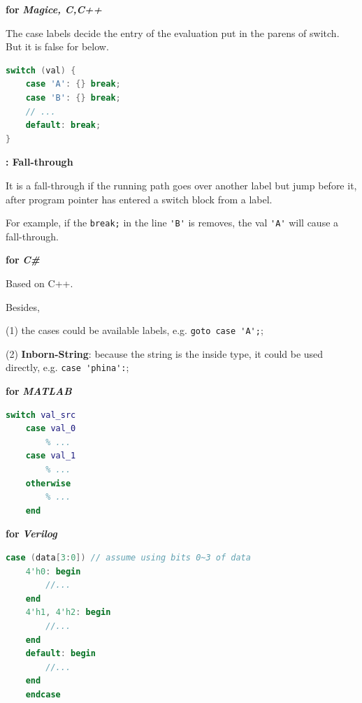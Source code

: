 \textbf{for }\textbf{\textit{Magice, C,C++}}



The case labels decide the entry of the evaluation put in the parens of switch. But it is false for below.



\begin{lstlisting}[language=C]
switch (val) {
	case 'A': {} break;
	case 'B': {} break;
	// ...
	default: break;
}
\end{lstlisting}



\textbf{: Fall-through} 

It is a fall-through if the running path goes over another label but jump before it, after program pointer has entered a switch block from a label.

For example, if the \verb|break;| in the line \verb|'B'| is removes, the val \verb|'A'| will cause a fall-through.



\textbf{for }\textbf{\textit{C\#}}



Based on C++.

Besides,



(1) the cases could be available labels, e.g. \verb|goto case 'A';|;



(2) \textbf{Inborn-String}: because the string is the inside type, it could be used directly, e.g. \verb|case 'phina':|;



\textbf{for }\textbf{\textit{MATLAB}}

\begin{lstlisting}[language=MATLAB]
	switch val_src
	case val_0
		% ...
	case val_1
		% ...
	otherwise
		% ...
	end
\end{lstlisting}



\textbf{for }\textbf{\textit{Verilog}}

\begin{lstlisting}[language=Verilog]
	case (data[3:0]) // assume using bits 0~3 of data
	4'h0: begin
		//...
	end
	4'h1, 4'h2: begin
		//...
	end
	default: begin
		//...
	end
	endcase
\end{lstlisting}


